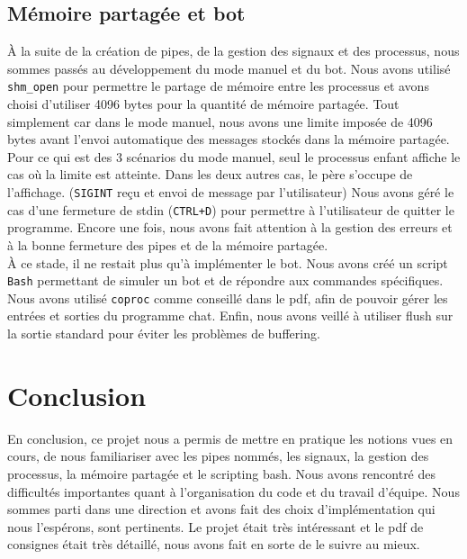 \documentclass{article}
\begin{document}
\subsection{Mémoire partagée et bot}
\label{memoire-partagee-et-bot}


À la suite de la création de pipes, de la gestion des signaux et des processus, nous sommes passés au développement du mode manuel et du bot.
Nous avons utilisé \texttt{shm\_open} pour permettre le partage de mémoire entre les processus et avons choisi d'utiliser 4096 bytes pour la quantité de mémoire partagée.
Tout simplement car dans le mode manuel, nous avons une limite imposée de 4096 bytes avant l'envoi automatique des messages stockés dans la mémoire partagée.
Pour ce qui est des 3 scénarios du mode manuel, seul le processus enfant affiche le cas où la limite est atteinte.
Dans les deux autres cas, le père s'occupe de l'affichage. (\texttt{SIGINT} reçu et envoi de message par l'utilisateur)
Nous avons géré le cas d'une fermeture de stdin (\texttt{CTRL+D}) pour permettre à l'utilisateur de quitter le programme.
Encore une fois, nous avons fait attention à la gestion des erreurs et à la bonne fermeture des pipes et de la mémoire partagée.\\

À ce stade, il ne restait plus qu'à implémenter le bot. Nous avons créé un script \texttt{Bash} permettant de simuler un bot et de répondre aux commandes spécifiques.
Nous avons utilisé \texttt{coproc} comme conseillé dans le pdf, afin de pouvoir gérer les entrées et sorties du programme chat.
Enfin, nous avons veillé à utiliser flush sur la sortie standard pour éviter les problèmes de buffering.



\section{Conclusion}
\label{conclusion}

En conclusion, ce projet nous a permis de mettre en pratique les notions vues en cours, de nous familiariser avec les pipes nommés, les signaux, la gestion des processus, la mémoire partagée et le scripting bash.
Nous avons rencontré des difficultés importantes quant à l'organisation du code et du travail d'équipe. Nous sommes parti dans une direction et avons fait des choix d'implémentation qui nous l'espérons, sont pertinents.
Le projet était très intéressant et le pdf de consignes était très détaillé, nous avons fait en sorte de le suivre au mieux.
\end{document}
